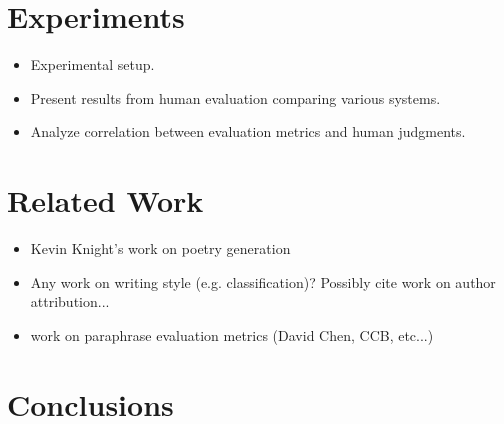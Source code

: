 \documentclass[10pt,a5paper,twoside]{article}
\begin{document}
\section{Experiments}
\begin{itemize}
  \item Experimental setup.
  \item Present results from human evaluation comparing various systems.
  \item Analyze correlation between evaluation metrics and human judgments.
\end{itemize}

\section{Related Work}
\begin{itemize}
  \item Kevin Knight's work on poetry generation
  \item Any work on writing style (e.g. classification)?  Possibly cite work on author attribution...
  \item work on paraphrase evaluation metrics (David Chen, CCB, etc...)
\end{itemize}

\section{Conclusions}





\end{document}
